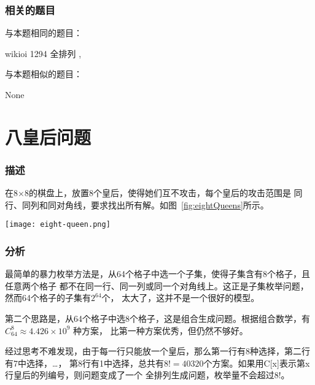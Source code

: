 \subsubsection{相关的题目}
与本题相同的题目：
\begindot
\item wikioi 1294 全排列 , 
\myenddot

与本题相似的题目：
\begindot
\item None
\myenddot


\section{八皇后问题} %

\subsubsection{描述}
在8×8的棋盘上，放置8个皇后，使得她们互不攻击，每个皇后的攻击范围是
同行、同列和同对角线，要求找出所有解。如图~\ref{fig:eightQueens}所示。

\begin{center}
\texttt{[image: eight-queen.png]} \\
\label{fig:eightQueens}
\end{center}

\subsubsection{分析}
最简单的暴力枚举方法是，从64个格子中选一个子集，使得子集含有8个格子，且任意两个格子
都不在同一行、同一列或同一个对角线上。这正是子集枚举问题，然而64个格子的子集有$2^{64}$个，
太大了，这并不是一个很好的模型。

第二个思路是，从64个格子中选8个格子，这是组合生成问题。根据组合数学，有 $C_{64}^{8} \approx 4.426 \times 10^9$ 种方案，
比第一种方案优秀，但仍然不够好。

经过思考不难发现，由于每一行只能放一个皇后，那么第一行有8种选择，第二行有7中选择，…，
第8行有1中选择，总共有$8!=40320$个方案。如果用C[x]表示第x行皇后的列编号，则问题变成了一个
全排列生成问题，枚举量不会超过8!。


